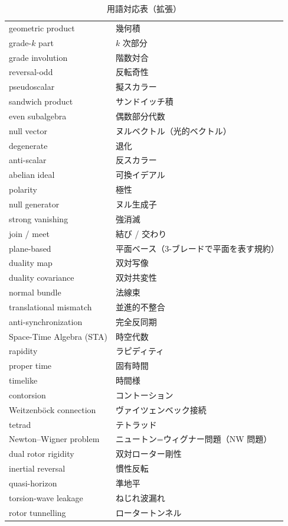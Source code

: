 \documentclass[dvipdfmx,a4paper,oneside]{jsbook}
\numberwithin{equation}{chapter}
\begin{document}
\begin{table}[htbp]
  \centering
  \caption{用語対応表（拡張）}
  \label{tab:app-terminology}
  \begin{tabular}{@{}ll@{}}
    \toprule
    geometric product & 幾何積 \\
    grade-\(k\) part & \(k\) 次部分 \\
    grade involution & 階数対合 \\
    reversal-odd & 反転奇性 \\
    pseudoscalar & 擬スカラー \\
    sandwich product & サンドイッチ積 \\
    even subalgebra & 偶数部分代数 \\
    \midrule
    null vector & ヌルベクトル（光的ベクトル） \\
    degenerate & 退化 \\
    anti-scalar & 反スカラー \\
    abelian ideal & 可換イデアル \\
    polarity & 極性 \\
    null generator & ヌル生成子 \\
    strong vanishing & 強消滅 \\
    join / meet & 結び / 交わり \\
    plane-based & 平面ベース（3-ブレードで平面を表す規約） \\
    \midrule
    duality map & 双対写像 \\
    duality covariance & 双対共変性 \\
    normal bundle & 法線束 \\
    translational mismatch & 並進的不整合 \\
    anti-synchronization & 完全反同期 \\
    \midrule
    Space-Time Algebra (STA) & 時空代数 \\
    rapidity & ラピディティ \\
    proper time & 固有時間 \\
    timelike & 時間様 \\
    contorsion & コントーション \\
    Weitzenböck connection & ヴァイツェンベック接続 \\
    tetrad & テトラッド \\
    Newton--Wigner problem & ニュートン=ウィグナー問題（NW 問題） \\
    \midrule
    dual rotor rigidity & 双対ローター剛性 \\
    inertial reversal & 慣性反転 \\
    quasi-horizon & 準地平 \\
    torsion-wave leakage & ねじれ波漏れ \\
    rotor tunnelling & ロータートンネル \\
    \bottomrule
  \end{tabular}
\end{table}
\end{document}
